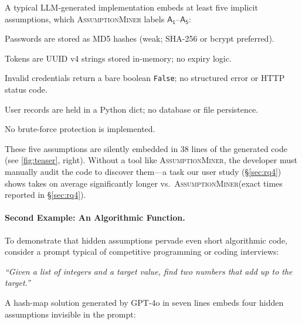 \documentclass[sigconf,review,anonymous]{acmart}
\newcommand{\sysname}{\textsc{AssumptionMiner}\xspace}
\newcommand{\Aone}{$\mathsf{A_1}$\xspace}
\newcommand{\Atwo}{$\mathsf{A_2}$\xspace}
\newcommand{\Athree}{$\mathsf{A_3}$\xspace}
\newcommand{\Afour}{$\mathsf{A_4}$\xspace}
\newcommand{\Afive}{$\mathsf{A_5}$\xspace}
\newcommand{\code}[1]{\texttt{#1}}
\begin{document}
A typical LLM-generated implementation embeds at least five implicit assumptions,
which \sysname labels \Aone–\Afive:

\begin{description}[leftmargin=2em, labelindent=0pt, noitemsep]
  \item[\Aone \textbf{Password storage}:] Passwords are stored as MD5 hashes
       (weak; SHA-256 or bcrypt preferred).
  \item[\Atwo \textbf{Session format}:] Tokens are UUID v4 strings stored in-memory;
       no expiry logic.
  \item[\Athree \textbf{Error handling}:] Invalid credentials return a bare boolean
       \code{False}; no structured error or HTTP status code.
  \item[\Afour \textbf{Persistence}:] User records are held in a Python dict; no
       database or file persistence.
  \item[\Afive \textbf{Rate-limiting}:] No brute-force protection is implemented.
\end{description}

These five assumptions are silently embedded in 38 lines of the generated code
(see \cref{fig:teaser}, right).  Without a tool like \sysname, the developer must manually
audit the code to discover them—a task our user study (\S\ref{sec:rq4}) shows takes on
average significantly longer vs.\ \sysname (exact times reported in \S\ref{sec:rq4}).

\paragraph{Second Example: An Algorithmic Function.}
To demonstrate that hidden assumptions pervade even short algorithmic code,
consider a prompt typical of competitive programming or coding interviews:

\begin{mdframed}[linewidth=0.8pt, backgroundcolor=gray!7,
                 innerleftmargin=8pt, innerrightmargin=8pt,
                 innertopmargin=4pt, innerbottommargin=4pt]
\emph{``Given a list of integers and a target value, find two numbers that add up to the target.''}
\end{mdframed}

A hash-map solution generated by GPT-4o in seven lines embeds four hidden
assumptions invisible in the prompt:
\end{document}
